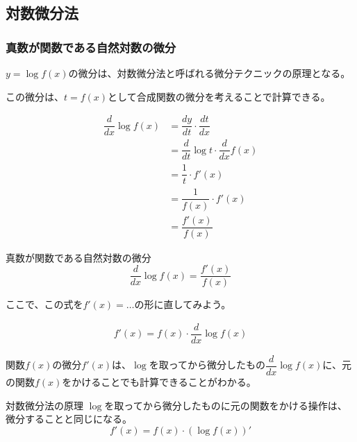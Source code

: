 \documentclass[../../imaging-math]{subfiles}
\begin{document}
\subsection{対数微分法}

\subsubsection{真数が関数である自然対数の微分}

$y=\log f(x)$の微分は、対数微分法と呼ばれる微分テクニックの原理となる。

この微分は、$t=f(x)$として合成関数の微分を考えることで計算できる。

\begin{align}
  \dfrac{d}{dx}\log f(x) & = \dfrac{dy}{dt} \cdot \dfrac{dt}{dx}         \\
                         & = \dfrac{d}{dt}\log t \cdot \dfrac{d}{dx}f(x) \\
                         & = \dfrac{1}{t} \cdot f'(x)                    \\
                         & = \dfrac{1}{f(x)} \cdot f'(x)                 \\
                         & = \dfrac{f'(x)}{f(x)}
\end{align}

\begin{theorem}{真数が関数である自然対数の微分}
  \LARGE
  \begin{equation}
    \dfrac{d}{dx}\log f(x) = \dfrac{f'(x)}{f(x)}
  \end{equation}
\end{theorem}

ここで、この式を$f'(x) = \ldots$の形に直してみよう。

\begin{align}
  f'(x) = f(x) \cdot \dfrac{d}{dx}\log f(x)
\end{align}

関数$f(x)$の微分$f'(x)$は、$\log$を取ってから微分したもの$\dfrac{d}{dx}\log f(x)$に、元の関数$f(x)$をかけることでも計算できることがわかる。

\begin{theorem}{対数微分法の原理}
  \titlegap
  $\log$を取ってから微分したものに元の関数をかける操作は、微分することと同じになる。
  \LARGE
  \begin{equation}
    f'(x) = f(x) \cdot \left(\log f(x)\right)'
  \end{equation}
\end{theorem}
\end{document}
